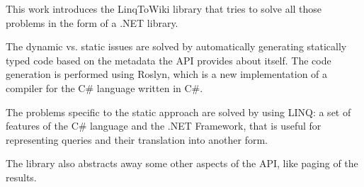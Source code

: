 \medskip

This work introduces the LinqToWiki library that tries to solve all those problems
in the form of a .NET library.

The dynamic vs. static issues are solved by automatically generating statically typed
code based on the metadata the API provides about itself.
The code generation is performed using Roslyn,
which is a new implementation of a compiler for the C\# language written in C\#.

The problems specific to the static approach are solved by using \ac{LINQ}:
a set of features of the C\# language and the .NET Framework,
that is useful for representing queries and their translation into another form.

The library also abstracts away some other aspects of the \ac{API}, like paging of the results.